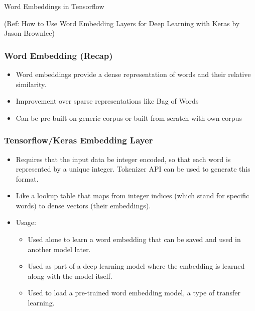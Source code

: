 \begin{frame}[fragile]\frametitle{}
\begin{center}
{\Large Word Embeddings in Tensorflow}
\end{center}

{\tiny (Ref: How to Use Word Embedding Layers for Deep Learning with Keras
by Jason Brownlee)}
\end{frame}

\begin{frame}[fragile]\frametitle{Word Embedding (Recap)}

\begin{itemize}
\item Word embeddings provide a dense representation of words and their relative similarity.
\item Improvement over sparse representations like Bag of Words
\item Can be pre-built on generic corpus or built from scratch with own corpus
\end{itemize}


\end{frame}

\begin{frame}[fragile]\frametitle{Tensorflow/Keras Embedding Layer}

\begin{itemize}
\item Requires that the input data be integer encoded, so that each word is represented by a unique integer. Tokenizer API can be used to generate this format.
\item Like a lookup table that maps from integer indices (which stand for specific words) to dense vectors (their embeddings).
\item Usage:
\begin{itemize}
\item Used alone to learn a word embedding that can be saved and used in another model later.
\item Used as part of a deep learning model where the embedding is learned along with the model itself.
\item Used to load a pre-trained word embedding model, a type of transfer learning.
\end{itemize}

\end{itemize}


\end{frame}

